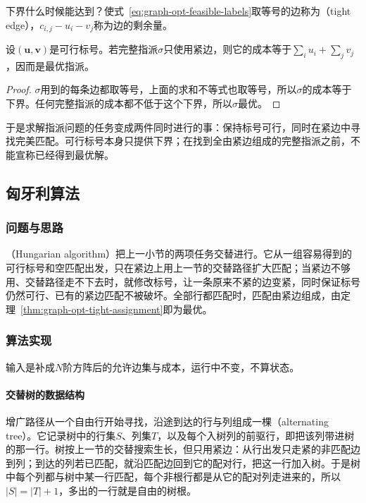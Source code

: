 下界什么时候能达到？使式~\eqref{eq:graph-opt-feasible-labels}取等号的边称为（tight edge），$c_{i,j}-u_i-v_j$称为边的剩余量。

\begin{theorem}[紧边指派的最优性]
\label{thm:graph-opt-tight-assignment}
设$(\bm u,\bm v)$是可行标号。若完整指派$\sigma$只使用紧边，则它的成本等于$\sum_iu_i+\sum_jv_j$，因而是最优指派。
\end{theorem}

\begin{proof}
$\sigma$用到的每条边都取等号，上面的求和不等式也取等号，所以$\sigma$的成本等于下界。任何完整指派的成本都不低于这个下界，所以$\sigma$最优。
\end{proof}

于是求解指派问题的任务变成两件同时进行的事：保持标号可行，同时在紧边中寻找完美匹配。可行标号本身只提供下界；在找到全由紧边组成的完整指派之前，不能宣称已经得到最优解。

\subsection{匈牙利算法}
\label{sec:graph-opt-hungarian}

\subsubsection{问题与思路}

（Hungarian algorithm）把上一小节的两项任务交替进行。它从一组容易得到的可行标号和空匹配出发，只在紧边上用上一节的交替路径扩大匹配；当紧边不够用、交替路径走不下去时，就修改标号，让一条原来不紧的边变紧，同时保证标号仍然可行、已有的紧边匹配不被破坏。全部行都匹配时，匹配由紧边组成，由定理~\ref{thm:graph-opt-tight-assignment}即为最优。

\subsubsection{算法实现}

输入是补成$N$阶方阵后的允许边集与成本，运行中不变，不算状态。

\paragraph{交替树的数据结构}
增广路径从一个自由行开始寻找，沿途到达的行与列组成一棵（alternating tree）。它记录树中的行集$S$、列集$T$，以及每个入树列的前驱行，即把该列带进树的那一行。树按上一节的交替搜索生长，但只用紧边：从行出发只走紧的非匹配边到列；到达的列若已匹配，就沿匹配边回到它的配对行，把这一行加入树。于是树中每个列都与树中某一行匹配，每个非根行都是从它的配对列走进来的，所以$|S|=|T|+1$，多出的一行就是自由的树根。

